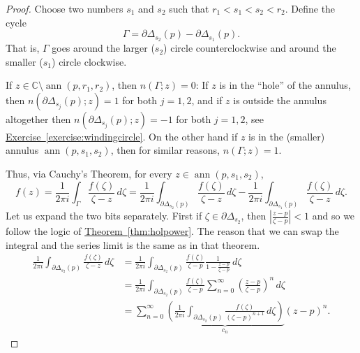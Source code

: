\documentclass[12pt,openany]{book}
\newcommand{\ann}{\operatorname{ann}}
\newcommand{\abs}[1]{\left\lvert {#1} \right\rvert}
\newcommand{\C}{{\mathbb{C}}}
\theoremstyle{plain}
\theoremstyle{remark}
\theoremstyle{definition}
\theoremstyle{exercise}
\theoremstyle{example}
\newcommand{\exerciseref}[1]{\hyperref[#1]{Exercise~\ref*{#1}}}
\newcommand{\thmref}[1]{\hyperref[#1]{Theorem~\ref*{#1}}}
\begin{document}
\begin{proof}
Choose two numbers $s_1$ and $s_2$ such that $r_1 < s_1 < s_2 < r_2$.
Define the cycle
\begin{equation*}
\Gamma = \partial \Delta_{s_2}(p) - \partial \Delta_{s_1}(p) .
\end{equation*}
That is, $\Gamma$ goes around the larger ($s_2$) circle counterclockwise and
around the smaller ($s_1$) circle clockwise.

If $z \in \C \setminus \ann(p,r_1,r_2)$, then $n(\Gamma;z) = 0$:
If $z$ is in the ``hole'' of the annulus, then
$n(\partial \Delta_{s_j}(p);z) = 1$ for both $j=1,2$, and 
if $z$ is outside the annulus altogether then
$n(\partial \Delta_{s_j}(p);z) = -1$ for both $j=1,2$,
see \exerciseref{exercise:windingcircle}.
On the other hand if $z$ is in the (smaller) annulus $\ann(p,s_1,s_2)$,
then for similar reasons, $n(\Gamma;z) = 1$.

Thus, via Cauchy's Theorem, for every $z \in \ann(p,s_1,s_2)$,
\begin{equation*}
f(z) = 
\frac{1}{2\pi i}
\int_{\Gamma} \frac{f(\zeta)}{\zeta-z} \, d\zeta 
=
\frac{1}{2\pi i}
\int_{\partial \Delta_{s_2}(p)} \frac{f(\zeta)}{\zeta-z} \, d\zeta 
-
\frac{1}{2\pi i}
\int_{\partial \Delta_{s_1}(p)} \frac{f(\zeta)}{\zeta-z} \, d\zeta  .
\end{equation*}
Let us expand the two bits separately.  First
if $\zeta \in \partial \Delta_{s_2}$, then
$\abs{\frac{z-p}{\zeta-p}} < 1$ and so
we follow the logic of \thmref{thm:holpower}.  The reason that we can
swap the integral and the series limit is the same as in that theorem.
\begin{equation*}
\begin{split}
\frac{1}{2\pi i}
\int_{\partial \Delta_{s_2}(p)} \frac{f(\zeta)}{\zeta-z} \, d\zeta 
& =
\frac{1}{2\pi i}
\int_{\partial \Delta_{s_2}(p)} \frac{f(\zeta)}{\zeta-p}
\frac{1}{1-\frac{z-p}{\zeta-p}} \, d\zeta
\\
& =
\frac{1}{2\pi i}
\int_{\partial \Delta_{s_2}(p)} \frac{f(\zeta)}{\zeta-p}
\sum_{n=0}^\infty
{\left(\frac{z-p}{\zeta-p}\right)}^n \, d\zeta
\\
& =
\sum_{n=0}^\infty
\underbrace{
\left(
\frac{1}{2\pi i}
\int_{\partial \Delta_{s_2}(p)} \frac{f(\zeta)}{{(\zeta-p)}^{n+1}}
 \, d\zeta
\right)
}_{c_n}
{(z-p)}^n .
\end{split}
\end{equation*}


\end{proof}
\end{document}
